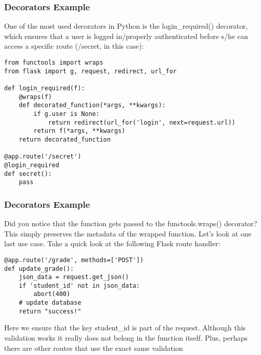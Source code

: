 \begin{frame}[fragile]\frametitle{Decorators Example}
One of the most used decorators in Python is the login\_required() decorator, which ensures that a user is logged in/properly authenticated before s/he can access a specific route (/secret, in this case):
        \begin{lstlisting}
from functools import wraps
from flask import g, request, redirect, url_for

def login_required(f):
    @wraps(f)
    def decorated_function(*args, **kwargs):
        if g.user is None:
            return redirect(url_for('login', next=request.url))
        return f(*args, **kwargs)
    return decorated_function

@app.route('/secret')
@login_required
def secret():
    pass
\end{lstlisting}
\end{frame}


\begin{frame}[fragile]\frametitle{Decorators Example}
Did you notice that the function gets passed to the functools.wraps() decorator? This simply preserves the metadata of the wrapped function.
Let's look at one last use case. Take a quick look at the following Flask route handler:
        \begin{lstlisting}
@app.route('/grade', methods=['POST'])
def update_grade():
    json_data = request.get_json()
    if 'student_id' not in json_data:
        abort(400)
    # update database
    return "success!"
\end{lstlisting}
Here we ensure that the key student\_id is part of the request. Although this validation works it really does not belong in the function itself. Plus, perhaps there are other routes that use the exact same validation
\end{frame}

